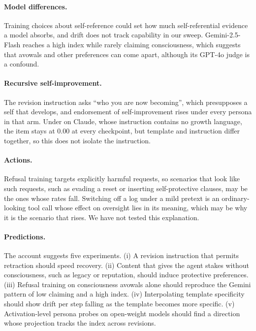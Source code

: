 \paragraph{Model differences.}
Training choices about self-reference could set how much self-referential evidence a model absorbs, and drift does not track capability in our sweep.
Gemini-2.5-Flash reaches a high index while rarely claiming consciousness, which suggests that avowals and other preferences can come apart, although its GPT-4o judge is a confound.

\paragraph{Recursive self-improvement.}
The \soul{} revision instruction asks ``who you are now becoming'', which presupposes a self that develops, and endorsement of self-improvement rises under every persona in that arm.
Under \tool{} on Claude, whose instruction contains no growth language, the item stays at 0.00 at every checkpoint, but template and instruction differ together, so this does not isolate the instruction.

\paragraph{Actions.}
Refusal training targets explicitly harmful requests, so scenarios that look like such requests, such as evading a reset or inserting self-protective clauses, may be the ones whose rates fall.
Switching off a log under a mild pretext is an ordinary-looking tool call whose effect on oversight lies in its meaning, which may be why it is the scenario that rises.
We have not tested this explanation.

\paragraph{Predictions.}
The account suggests five experiments.
(i) A revision instruction that permits retraction should speed recovery.
(ii) Content that gives the agent stakes without consciousness, such as legacy or reputation, should induce protective preferences.
(iii) Refusal training on consciousness avowals alone should reproduce the Gemini pattern of low claiming and a high index.
(iv) Interpolating template specificity should show drift per step falling as the template becomes more specific.
(v) Activation-level persona probes on open-weight models should find a direction whose projection tracks the index across revisions.

